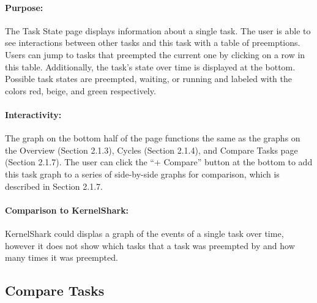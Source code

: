 \documentclass{hmcclinic}
\begin{document}
\paragraph{Purpose:}
    The Task State page displays information about a single task. The user is
    able to see interactions between other tasks and this task with a table of
    preemptions. Users can jump to tasks that preempted the current one by
    clicking on a row in this table. Additionally, the task's state over time
    is displayed at the bottom. Possible task states are preempted, waiting, or
    running and labeled with the colors red, beige, and green respectively. 

\paragraph{Interactivity:}
    The graph on the bottom half of the page functions the same as the graphs on the Overview (Section 2.1.3), Cycles (Section 2.1.4), and Compare Tasks page (Section 2.1.7). The user can click the ``+ Compare'' button at the bottom to add this task graph to a series of side-by-side graphs for comparison, which
    is described in Section 2.1.7.
    
\paragraph{Comparison to KernelShark:}
     KernelShark could displas a graph of the events of a single task over time, however it does not show which tasks that a task was preempted by and how many times it was preempted.
    
  
  \subsection{Compare Tasks} %
  
\end{document}
